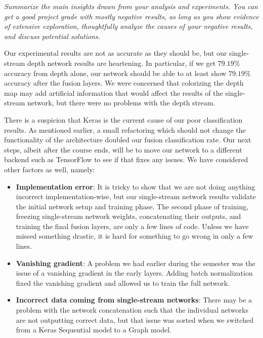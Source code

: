 
\textit{Summarize the main insights drawn from your analysis and experiments. You can get a good project grade with mostly negative results, as long as you show evidence of extensive exploration, thoughtfully analyze the causes of your negative results, and discuss potential solutions.}

Our experimental results are not as accurate as they should be, but our single-stream depth network results are heartening. In particular, if we get $79.19\%$ accuracy from depth alone, our network should be able to at least show $79.19\%$ accuracy after the fusion layers. We were concerned that colorizing the depth map may add artificial information that would affect the results of the single-stream network, but there were no problems with the depth stream.

There is a suspicion that Keras is the current cause of our poor classification results. As mentioned earlier, a small refactoring which should not change the functionality of the architecture doubled our fusion classification rate. Our next steps, albeit after the course ends, will be to move our network to a different backend such as TensorFlow to see if that fixes any issues. We have considered other factors as well, namely:

\begin{itemize}
    \item \textbf{Implementation error}: It is tricky to show that we are not doing anything incorrect implementation-wise, but our single-stream network results validate the initial network setup and training phase. The second phase of training, freezing single-stream network weights, concatenating their outputs, and training the final fusion layers, are only a few lines of code. Unless we have missed something drastic, it is hard for something to go wrong in only a few lines.

    \item \textbf{Vanishing gradient}: A problem we had earlier during the semester was the issue of a vanishing gradient in the early layers. Adding batch normalization fixed the vanishing gradient and allowed us to train the full network.

    \item \textbf{Incorrect data coming from single-stream networks}: There may be a problem with the network concatenation such that the individual networks are not outputting correct data, but that issue was sorted when we switched from a Keras Sequential model to a Graph model.

\end{itemize}



